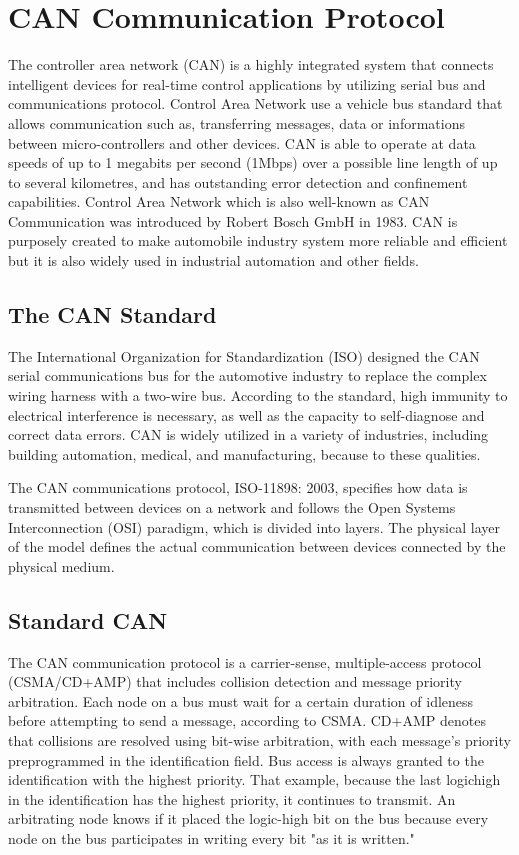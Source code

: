 
\section{CAN Communication Protocol}

The controller area network (CAN) is a highly integrated system that connects intelligent devices for  real-time control applications by utilizing serial bus and communications protocol. Control Area Network use a vehicle bus standard that allows communication such as, transferring messages, data or informations between micro-controllers and other devices. CAN is able to operate at data speeds of up to 1 megabits per second (1Mbps) over a possible line length of up to several kilometres, and has outstanding error detection and confinement capabilities. Control Area Network which is also well-known as CAN Communication was introduced by Robert Bosch GmbH in 1983. CAN is purposely created to make automobile industry system more reliable and efficient but it is also widely used in industrial automation and other fields. 
\subsection{The CAN Standard }

The International Organization for Standardization (ISO) designed the CAN serial communications bus for the automotive industry to replace the complex wiring harness with a two-wire bus. According to the standard, high immunity to electrical interference is necessary, as well as the capacity to self-diagnose and correct data errors. CAN is widely utilized in a variety of industries, including building automation, medical, and manufacturing, because to these qualities.


The CAN communications protocol, ISO-11898: 2003, specifies how data is transmitted between devices on a network and follows the Open Systems Interconnection (OSI) paradigm, which is divided into layers. The physical layer of the model defines the actual communication between devices connected by the physical medium. 

\subsection{Standard CAN }

The CAN communication protocol is a carrier-sense, multiple-access protocol (CSMA/CD+AMP) that includes collision detection and message priority arbitration. Each node on a bus must wait for a certain duration of idleness before attempting to send a message, according to CSMA. CD+AMP denotes that collisions are resolved using bit-wise arbitration, with each message's priority preprogrammed in the identification field. Bus access is always granted to the identification with the highest priority. That example, because the last logichigh in the identification has the highest priority, it continues to transmit. An arbitrating node knows if it placed the logic-high bit on the bus because every node on the bus participates in writing every bit "as it is written."

